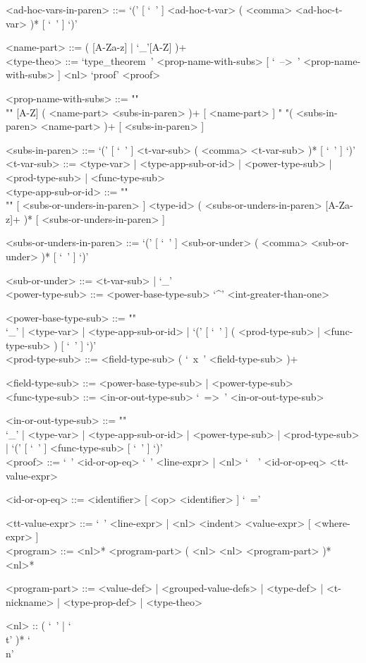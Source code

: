 \documentclass{article}
\begin{document}
\begin{grammar}
<ad-hoc-vars-in-paren> ::=
`(' [ `\ ' ] <ad-hoc-t-var> ( <comma> <ad-hoc-t-var> )* [ `\ ' ] `)'

<name-part> ::= ( [A-Za-z] | `_'[A-Z] )+
\\

\newpage
<type-theo> ::=
`type_theorem\ ' <prop-name-with-subs> [ `\ -->\ ' <prop-name-with-subs> ] <nl>
`proof' <proof>

<prop-name-with-subs> ::=  ""\\""
[A-Z] ( <name-part> <subs-in-paren> )+ [ <name-part> ]
\alt " "( <subs-in-paren> <name-part> )+ [ <subs-in-paren> ]

<subs-in-paren> ::=
`(' [ `\ ' ] <t-var-sub> ( <comma> <t-var-sub> )* [ `\ ' ] `)'
\\

<t-var-sub> ::=
<type-var> | <type-app-sub-or-id> | <power-type-sub> | <prod-type-sub> |
<func-type-sub>
\\

<type-app-sub-or-id> ::= ""\\""
[ <subs-or-unders-in-paren> ]
<type-id> ( <subs-or-unders-in-paren> [A-Za-z]+ )*
[ <subs-or-unders-in-paren> ]

<subs-or-unders-in-paren> ::=
`(' [ `\ ' ] <sub-or-under> ( <comma> <sub-or-under> )* [ `\ ' ] `)'

<sub-or-under> ::= <t-var-sub> | `_'
\\

<power-type-sub> ::= <power-base-type-sub> `^' <int-greater-than-one>

<power-base-type-sub> ::= ""\\
`_' | <type-var> | <type-app-sub-or-id> |
`(' [ `\ ' ] ( <prod-type-sub> | <func-type-sub> ) [ `\ ' ] `)'
\\

<prod-type-sub> ::= <field-type-sub> ( `\ x\ ' <field-type-sub> )+

<field-type-sub> ::= <power-base-type-sub> | <power-type-sub>
\\

<func-type-sub> ::= <in-or-out-type-sub> `\ =>\ ' <in-or-out-type-sub>

<in-or-out-type-sub> ::= ""\\
`_' | <type-var> | <type-app-sub-or-id> | <power-type-sub> | <prod-type-sub> |
`(' [ `\ ' ] <func-type-sub> [ `\ ' ] `)'
\\

<proof> ::=
`\ ' <id-or-op-eq> `\ ' <line-expr> |
<nl> `\ \ ' <id-or-op-eq>  <tt-value-expr>

<id-or-op-eq> ::= <identifier> [ <op> <identifier> ] `\ ='

<tt-value-expr> ::=
`\ ' <line-expr> | <nl> <indent> <value-expr> [ <where-expr> ]
\\

<program> ::=
<nl>* <program-part> ( <nl> <nl> <program-part> )* <nl>*

<program-part> ::=
<value-def> | <grouped-value-defs> | <type-def> | <t-nickname> |
<type-prop-def> | <type-theo>

<nl> :: ( `\ ' | `\\t' )* `\\n'
\end{grammar}
\end{document}
